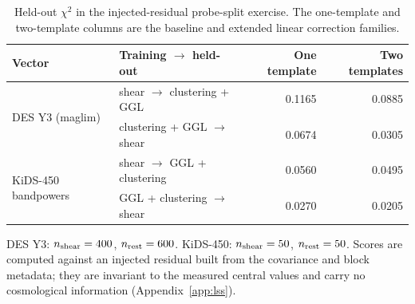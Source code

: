 \begin{table}[t]
\centering
\small
\caption{Held-out $\chi^2$ in the injected-residual probe-split exercise. The one-template and two-template columns are the baseline and extended linear correction families.}
\label{tab:lss_protocol}
\begin{tabular}{@{}llrr@{}}
\toprule
Vector & Training $\to$ held-out & One template & Two templates \\
\midrule
\multirow{2}{*}{DES Y3 (maglim)} & shear $\to$ clustering + GGL & 0.1165 & 0.0885 \\
 & clustering + GGL $\to$ shear & 0.0674 & 0.0305 \\
\midrule
\multirow{2}{*}{KiDS-450 bandpowers} & shear $\to$ GGL + clustering & 0.0560 & 0.0495 \\
 & GGL + clustering $\to$ shear & 0.0270 & 0.0205 \\
\bottomrule
\end{tabular}
\par\smallskip
\parbox{0.92\linewidth}{\footnotesize DES Y3: $n_{\rm shear}=400$, $n_{\rm rest}=600$. KiDS-450: $n_{\rm shear}=50$, $n_{\rm rest}=50$. Scores are computed against an injected residual built from the covariance and block metadata; they are invariant to the measured central values and carry no cosmological information (Appendix~\ref{app:lss}).}
\end{table}
